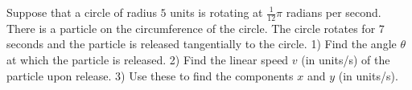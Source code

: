 Suppose that a circle of radius $5$ units is rotating at $\frac{1}{12}\pi$ radians per second. There is a particle on the circumference of the circle. The circle rotates for $7$ seconds and the particle is released tangentially to the circle. 1) Find the angle $\theta$ at which the particle is released. 2) Find the linear speed $v$ (in units/s) of the particle upon release. 3) Use these to find the components $x$ and $y$ (in units/s).
